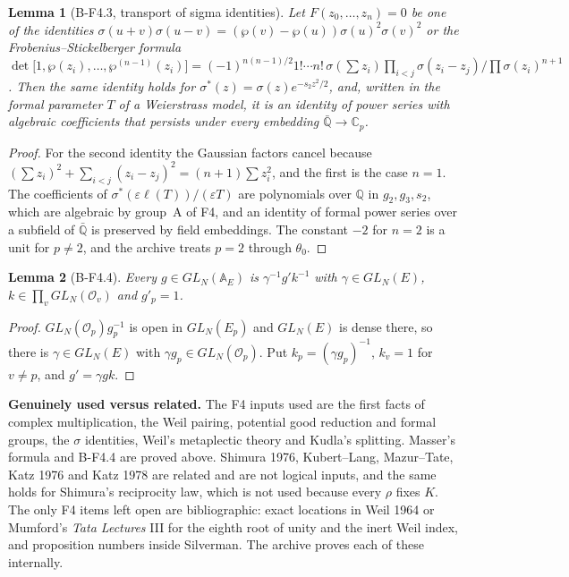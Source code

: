 \documentclass[11pt]{article}
\newtheorem{lemma}{Lemma}
\theoremstyle{definition}
\begin{document}
\begin{lemma}[B-F4.3, transport of sigma identities]
Let $F(z_0,\dots,z_n)=0$ be one of the identities $\sigma(u+v)\sigma(u-v)=(\wp(v)-\wp(u))\sigma(u)^2\sigma(v)^2$ or the Frobenius--Stickelberger formula $\det\bigl[1,\wp(z_i),\dots,\wp^{(n-1)}(z_i)\bigr]=(-1)^{n(n-1)/2}1!\cdots n!\,\sigma(\sum z_i)\prod_{i<j}\sigma(z_i-z_j)/\prod\sigma(z_i)^{n+1}$. Then the same identity holds for $\sigma^*(z)=\sigma(z)e^{-s_2z^2/2}$, and, written in the formal parameter $T$ of a Weierstrass model, it is an identity of power series with algebraic coefficients that persists under every embedding $\bar{\mathbb Q}\to\mathbb C_p$.
\end{lemma}
\begin{proof}
For the second identity the Gaussian factors cancel because $(\sum z_i)^2+\sum_{i<j}(z_i-z_j)^2=(n+1)\sum z_i^2$, and the first is the case $n=1$. The coefficients of $\sigma^*(\varepsilon\ell(T))/(\varepsilon T)$ are polynomials over $\mathbb Q$ in $g_2,g_3,s_2$, which are algebraic by group~A of F4, and an identity of formal power series over a subfield of $\bar{\mathbb Q}$ is preserved by field embeddings. The constant $-2$ for $n=2$ is a unit for $p\ne2$, and the archive treats $p=2$ through $\theta_0$.
\end{proof}

\begin{lemma}[B-F4.4]
Every $g\in GL_N(\mathbb A_E)$ is $\gamma^{-1}g'k^{-1}$ with $\gamma\in GL_N(E)$, $k\in\prod_vGL_N(\mathcal O_v)$ and $g'_p=1$.
\end{lemma}
\begin{proof}
$GL_N(\mathcal O_p)g_p^{-1}$ is open in $GL_N(E_p)$ and $GL_N(E)$ is dense there, so there is $\gamma\in GL_N(E)$ with $\gamma g_p\in GL_N(\mathcal O_p)$. Put $k_p=(\gamma g_p)^{-1}$, $k_v=1$ for $v\ne p$, and $g'=\gamma gk$.
\end{proof}

\noindent\textbf{Genuinely used versus related.} The F4 inputs used are the first facts of complex multiplication, the Weil pairing, potential good reduction and formal groups, the $\sigma$ identities, Weil's metaplectic theory and Kudla's splitting. Masser's formula and B-F4.4 are proved above. Shimura 1976, Kubert--Lang, Mazur--Tate, Katz 1976 and Katz 1978 are related and are not logical inputs, and the same holds for Shimura's reciprocity law, which is not used because every $\rho$ fixes $K$. The only F4 items left open are bibliographic: exact locations in Weil 1964 or Mumford's \emph{Tata Lectures} III for the eighth root of unity and the inert Weil index, and proposition numbers inside Silverman. The archive proves each of these internally.
\end{document}
